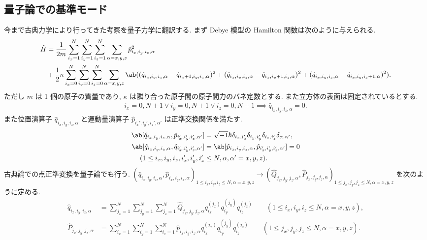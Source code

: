 \documentclass[uplatex,dvipdfmx,a4paper,11pt]{jlreq}
\numberwithin{equation}{section}
\theoremstyle{definition}
\begin{document}
\subsection{量子論での基準モード}
今まで古典力学により行ってきた考察を量子力学に翻訳する. まず Debye 模型の Hamilton 関数は次のように与えられる.
\begin{align}
  \hat{H} & = \frac{1}{2m}\sum_{i_x=1}^{N}\sum_{i_y=1}^{N}\sum_{i_z=1}^{N}\sum_{\alpha=x,y,z}\hat{p}_{i_x,i_y,i_z,\alpha}^2                                                                                                                                                                                       \\
          & + \frac{1}{2}\kappa\sum_{i_x=0}^{N}\sum_{i_y=0}^{N}\sum_{i_z=0}^{N}\sum_{\alpha=x,y,z}\ab((\hat{q}_{i_x,i_y,i_z,\alpha} - \hat{q}_{i_x+1,i_y,i_z,\alpha})^2 + (\hat{q}_{i_x,i_y,i_z,\alpha} - \hat{q}_{i_x,i_y+1,i_z,\alpha})^2 + (\hat{q}_{i_x,i_y,i_z,\alpha} - \hat{q}_{i_x,i_y,i_z+1,\alpha})^2).
\end{align}
ただし $m$ は 1 個の原子の質量であり, $\kappa$ は隣り合った原子間の原子間力のバネ定数とする. また立方体の表面は固定されているとする.
\begin{align}
  i_x = 0, N+1\lor i_y = 0, N+1\lor i_z = 0, N+1 \implies \hat{q}_{i_x,i_y,i_z,\alpha} = 0.
\end{align}
また位置演算子 $\hat{q}_{i_x,i_y,i_z,\alpha}$ と運動量演算子 $\hat{p}_{i_x',i_y',i_z',\alpha'}$ は正準交換関係を満たす.
\begin{align}
  \ab[\hat{q}_{i_x,i_y,i_z,\alpha}, \hat{p}_{i_x',i_y',i_z',\alpha'}] & = \sqrt{-1}\hbar\delta_{i_x,i_x'}\delta_{i_y,i_y'}\delta_{i_z,i_z'}\delta_{\alpha,\alpha'}, \\
  \ab[\hat{q}_{i_x,i_y,i_z,\alpha}, \hat{q}_{i_x',i_y',i_z',\alpha'}] & = \ab[\hat{p}_{i_x,i_y,i_z,\alpha}, \hat{p}_{i_x',i_y',i_z',\alpha'}] = 0                   \\
  (1\leq i_x,i_y,i_z,i_x',i_y',i_z'                                   & \leq N, \alpha,\alpha' = x,y,z).
\end{align}
古典論での点正準変換を量子論でも行う. $(\hat{q}_{i_x,i_y,i_z,\alpha}, \hat{p}_{i_x,i_y,i_z,\alpha})_{1\leq i_x,i_y,i_z\leq N,\alpha=x,y,z}\to(\hat{Q}_{j_x,j_y,j_z,\alpha}, \hat{P}_{j_x,j_y,j_z,\alpha})_{1\leq j_x,j_y,j_z\leq N,\alpha=x,y,z}$ を次のように定める.
\begin{align}
  \hat{q}_{i_x,i_y,i_z,\alpha} & = \sum_{j_x=1}^{N}\sum_{j_y=1}^{N}\sum_{j_z=1}^{N}\hat{Q}_{j_x,j_y,j_z,\alpha}q_{i_x}^{(j_x)}q_{i_y}^{(j_y)}q_{i_z}^{(j_z)} \qquad (1\leq i_x,i_y,i_z \leq N, \alpha = x,y,z), \\
  \hat{P}_{j_x,j_y,j_z,\alpha} & = \sum_{i_x=1}^{N}\sum_{i_y=1}^{N}\sum_{i_z=1}^{N}\hat{p}_{i_x,i_y,i_z,\alpha}q_{i_x}^{(j_x)}q_{i_y}^{(j_y)}q_{i_z}^{(j_z)} \qquad (1\leq j_x,j_y,j_z \leq N, \alpha = x,y,z).
\end{align}
\end{document}

